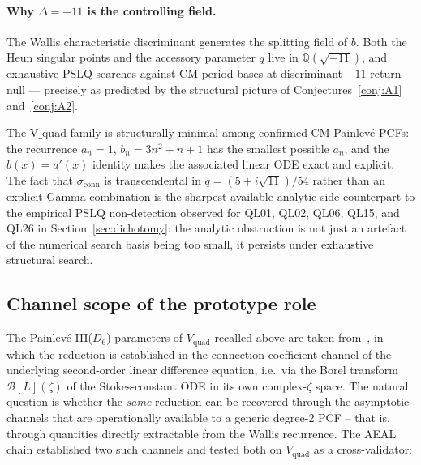 \documentclass[12pt]{amsart}
\theoremstyle{definition}
\begin{document}
\paragraph{Why $\Delta=-11$ is the controlling field.}
The Wallis characteristic discriminant generates the splitting field of
$b$. Both the Heun singular points and the accessory parameter $q$ live
in $\mathbb{Q}(\sqrt{-11})$, and exhaustive PSLQ searches against
CM-period bases at discriminant $-11$ return null --- precisely as
predicted by the structural picture of Conjectures~\ref{conj:A1}
and~\ref{conj:A2}.

The V$\_$quad family is structurally minimal among confirmed CM
Painlev\'e PCFs: the recurrence $a_{n}=1$, $b_{n}=3n^{2}+n+1$ has the
smallest possible $a_{n}$, and the $b(x)=a'(x)$ identity makes the
associated linear ODE exact and explicit. The fact that
$\sigma_{\mathrm{conn}}$ is transcendental in
$q=(5+i\sqrt{11})/54$ rather than an explicit Gamma combination is the
sharpest available analytic-side counterpart to the empirical PSLQ
non-detection observed for QL01, QL02, QL06, QL15, and QL26 in
Section~\ref{sec:dichotomy}: the analytic obstruction is not just an
artefact of the numerical search basis being too small, it persists
under exhaustive structural search.

\subsection{Channel scope of the prototype role}\label{ssec:vquad-channel-scope}

The Painlev\'e III($D_{6}$) parameters of $V_{\mathrm{quad}}$ recalled
above are taken from~\cite{Papanokechi2026Vquad}, in which the
reduction is established in the connection-coefficient channel of
the underlying second-order linear difference equation, i.e.\ via the
Borel transform $\mathcal{B}[L](\zeta)$ of the Stokes-constant ODE in
its own complex-$\zeta$ space. The natural question is whether the
\emph{same} reduction can be recovered through the asymptotic channels
that are operationally available to a generic degree-2 PCF -- that
is, through quantities directly extractable from the Wallis
recurrence. The AEAL chain established two such channels and tested
both on $V_{\mathrm{quad}}$ as a cross-validator:
\end{document}
